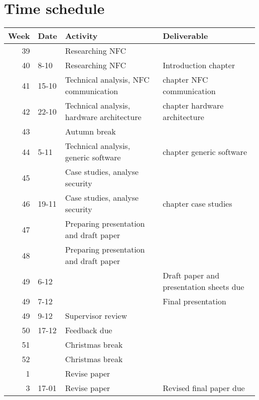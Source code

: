 \documentclass[11pt]{article} %
\begin{document}
\section{Time schedule}
\begin{center}
  \begin{tabular}{ | r | l | l || l | }
    \hline
    Week & Date & Activity & Deliverable \\ \hline
    39 &  & Researching NFC &  \\ \hline
    40 & 8-10 & Researching NFC & Introduction chapter \\ \hline
    41 & 15-10 & Technical analysis, NFC communication & chapter NFC communication \\ \hline
    42 & 22-10 & Technical analysis, hardware architecture & chapter hardware architecture \\ \hline
    43 & & Autumn break & \\ \hline
    44 & 5-11 & Technical analysis, generic software & chapter generic software \\ \hline
    45 & & Case studies, analyse security & \\ \hline
    46 & 19-11 & Case studies, analyse security & chapter case studies\\ \hline
    47 & & Preparing presentation and draft paper & \\ \hline
    48 & & Preparing presentation and draft paper & \\ \hline
    49 & 6-12 & & Draft paper and presentation sheets due \\ \hline
    49 & 7-12 & & Final presentation  \\ \hline
    49 & 9-12 & Supervisor review & \\ \hline
    50 & 17-12 & Feedback due & \\ \hline
    51 & & Christmas break & \\ \hline
    52 & & Christmas break & \\ \hline
    1 & & Revise paper & \\ \hline
    3 & 17-01 & Revise paper & Revised final paper due \\ \hline
  \end{tabular}
\end{center}



\end{document}
